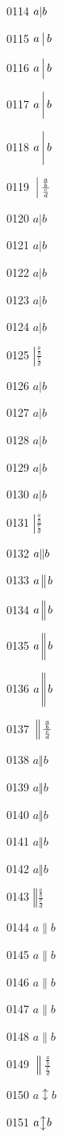 \documentclass{article}
\begin{document}
0114 $a\arrowvert b$\par
0115 $a\big\arrowvert b$\par
0116 $a\Big\arrowvert b$\par
0117 $a\bigg\arrowvert b$\par
0118 $a\Bigg\arrowvert b$\par
0119 $\left\arrowvert \frac{\frac{a}{b}}{\frac{c}{d}}\right.$\par
0120 $a\vert b$\par
0121 $a\big\vert b$\par
0122 $a\Big\vert b$\par
0123 $a\bigg\vert b$\par
0124 $a\Bigg\vert b$\par
0125 $\left\vert \frac{\frac{a}{b}}{\frac{c}{d}}\right.$\par
0126 $a|b$\par
0127 $a\big|b$\par
0128 $a\Big|b$\par
0129 $a\bigg|b$\par
0130 $a\Bigg|b$\par
0131 $\left|\frac{\frac{a}{b}}{\frac{c}{d}}\right.$\par
0132 $a\Arrowvert b$\par
0133 $a\big\Arrowvert b$\par
0134 $a\Big\Arrowvert b$\par
0135 $a\bigg\Arrowvert b$\par
0136 $a\Bigg\Arrowvert b$\par
0137 $\left\Arrowvert \frac{\frac{a}{b}}{\frac{c}{d}}\right.$\par
0138 $a\Vert b$\par
0139 $a\big\Vert b$\par
0140 $a\Big\Vert b$\par
0141 $a\bigg\Vert b$\par
0142 $a\Bigg\Vert b$\par
0143 $\left\Vert \frac{\frac{a}{b}}{\frac{c}{d}}\right.$\par
0144 $a\| b$\par
0145 $a\big\| b$\par
0146 $a\Big\| b$\par
0147 $a\bigg\| b$\par
0148 $a\Bigg\| b$\par
0149 $\left\| \frac{\frac{a}{b}}{\frac{c}{d}}\right.$\par
0150 $a\updownarrow b$\par
0151 $a\big\updownarrow b$\par
\end{document}

